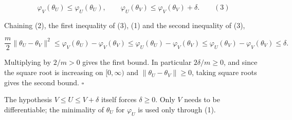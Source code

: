 \documentclass[11pt,a4paper]{article}
\begin{document}
\[\varphi_V(\theta_U)\le\varphi_U(\theta_U),\qquad\varphi_U(\theta_V)\le\varphi_V(\theta_V)+\delta.\qquad(3)\]


Chaining (2), the first inequality of (3), (1) and the second inequality of (3),


\[\frac m2\|\theta_U-\theta_V\|^2\le\varphi_V(\theta_U)-\varphi_V(\theta_V)\le\varphi_U(\theta_U)-\varphi_V(\theta_V)\le\varphi_U(\theta_V)-\varphi_V(\theta_V)\le\delta .\]


Multiplying by \(2/m>0\) gives the first bound. In particular \(2\delta/m\ge0\), and since the square root is increasing on \([0,\infty)\) and \(\|\theta_U-\theta_V\|\ge0\), taking square roots gives the second bound. \(\square\)




The hypothesis \(V\le U\le V+\delta\) itself forces \(\delta\ge0\). Only \(V\) needs to be differentiable; the minimality of \(\theta_U\) for \(\varphi_U\) is used only through (1).
\end{document}
